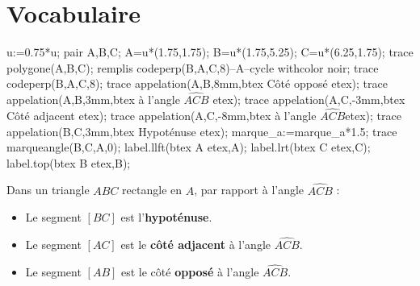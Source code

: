 \section{Vocabulaire}
\begin{definitions}
    \begin{minipage}{0.4\linewidth}
        \begin{Geometrie}[CoinHD={(5u,4.5u)}]
            u:=0.75*u;            
            pair A,B,C;
            A=u*(1.75,1.75);
            B=u*(1.75,5.25);
            C=u*(6.25,1.75);
            trace polygone(A,B,C);
            remplis codeperp(B,A,C,8)--A--cycle withcolor noir;
            trace codeperp(B,A,C,8);
            trace appelation(A,B,8mm,btex Côté opposé etex);
            trace appelation(A,B,3mm,btex à l'angle $\widehat{ACB}$ etex);
            trace appelation(A,C,-3mm,btex Côté adjacent etex);
            trace appelation(A,C,-8mm,btex à l'angle $\widehat{ACB}$etex);
            trace appelation(B,C,3mm,btex Hypoténuse etex);
            marque_a:=marque_a*1.5;    
            trace marqueangle(B,C,A,0);
            label.llft(btex A etex,A);
            label.lrt(btex C etex,C);
            label.top(btex B etex,B);
        \end{Geometrie}
    \end{minipage}
    \begin{minipage}{0.6\linewidth}
        Dans un triangle $ABC$ rectangle en $A$, par rapport à l'angle $\widehat{ACB}$ :
            \begin{itemize}
                \item Le segment $[BC]$ est l'\textbf{hypoténuse}.
                \item Le segment $[AC]$ est le \textbf{côté adjacent} à l'angle $\widehat{ACB}$.
                \item Le segment $[AB]$ est le côté \textbf{opposé} à l'angle $\widehat{ACB}$.
            \end{itemize}
    \end{minipage}
\end{definitions}